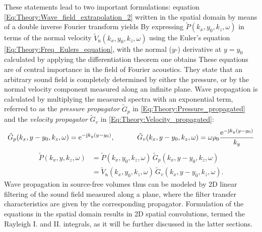 \vspace{3mm}
These statements lead to two important formulations:
equation \eqref{Eq:Theory:Wave_field_extrapolation_2} written in the spatial domain by means of a double inverse Fourier transform yields
By expressing $\tilde{P}(k_x,y_0,k_z,\omega)$ in terms of the normal velocity $\tilde{V}_{\mathrm{n}}(k_x,y_0,k_z,\omega)$ using the Euler's equation  \eqref{Eq:Theory:Freq_Eulers_equation}, with the normal ($y$-) derivative at $y = y_0$ calculated by applying the differentiation theorem one obtains
These equations are of central importance in the field of Fourier acoustics. 
They state that an arbitrary sound field is completely determined by either the pressure, or by the normal velocity component measured along an infinite plane. 
Wave propagation is calculated by multiplying the measured spectra with an exponential term, referred to as the \emph{pressure propagator} $\tilde{G}_p$ in \eqref{Eq:Theory:Pressure_propagated} and the \emph{velocity propagator} $\tilde{G}_v$ in \eqref{Eq:Theory:Velocity_propagated}:
\begin{equation}
\tilde{G}_p(k_x,y-y_0,k_z,\omega) = \mathrm{e}^{-\mathrm{j} k_y ( y - y_0 ) } ,\ \hspace{1cm}
\tilde{G}_v(k_x,y-y_0,k_z,\omega) = \omega \rho_0 \frac{\mathrm{e}^{-\mathrm{j} k_y ( y - y_0 ) } }{k_y}
\label{Eq:Theory:propagators}
\end{equation}
\begin{align}
\tilde{P}(k_x,y,k_z,\omega) &= \tilde{P}(k_x,y_0,k_z,\omega) \, \tilde{G}_p(k_x,y-y_0,k_z,\omega) \\
                            &= \tilde{V}_{\mathrm{n}}(k_x,y_0,k_z,\omega) \, \tilde{G}_v(k_x,y-y_0,k_z,\omega).
\end{align}
Wave propagation in source-free volumes thus can be modeled by 2D linear filtering of the sound field measured along a plane, where the filter transfer characteristics are given by the corresponding propagator.
Formulation of the equations in the spatial domain results in 2D spatial convolutions, termed the Rayleigh I. and II. integrals, as it will be further discussed in the latter sections.

